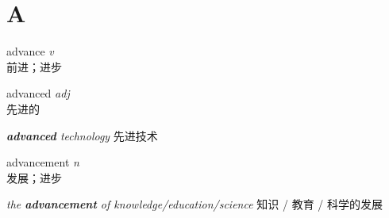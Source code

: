 \section{A}

\item[] {
    \lettrine{advance}{}  
    \textit{v} 
    \\
    前进；进步
    
} 

\item[] {
    \lettrine{advanced}{}  
    \textit{adj} 
    \\
    先进的

    \textit{\textbf{advanced} technology}
    先进技术
} 

\item[] {
    \lettrine{advancement}{}  
    \textit{n} 
    \\
    发展；进步

    \textit{the \textbf{advancement} of knowledge/education/science}
    知识 / 教育 / 科学的发展
} 
